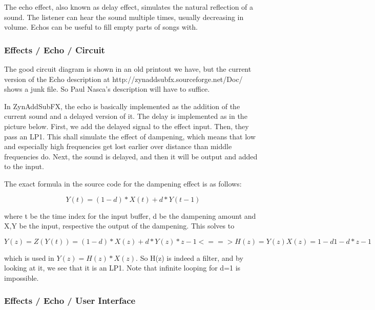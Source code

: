    The echo effect, also known as delay effect, simulates the natural
   reflection of a sound. The listener can hear the sound multiple times,
   usually decreasing in volume. Echos can be useful to fill empty parts of
   songs with.

\subsubsection{Effects / Echo / Circuit}
\label{subsubsec:effects_edit_echo_circuit}

   The good circuit diagram is shown in an old printout we have, but the
   current version of the Echo description at
   http://zynaddsubfx.sourceforge.net/Doc/ shows a
   junk file.  So Paul Nasca's description will have to suffice.


   In ZynAddSubFX, the echo is basically implemented as the addition of the
   current sound and a delayed version of it. The delay is implemented as in
   the picture below. First, we add the delayed signal to the effect input.
   Then, they pass an LP1. This shall simulate the effect of dampening, which
   means that low and especially high frequencies get lost earlier over
   distance than middle frequencies do. Next, the sound is delayed, and then
   it will be output and added to the input.

   The exact formula in the source code for the dampening effect is as
   follows:

   \[Y(t)=(1-d)*X(t)+d*Y(t-1)\]

   where t be the time index for the input buffer, d be the dampening amount
   and X,Y be the input, respective the output of the dampening. This solves
   to

   \[Y(z)=Z(Y(t))=(1-d)*X(z)+d*Y(z)*z-1 <==> H(z)=Y(z)X(z)=1-d1-d*z-1\]

   which is used in \(Y(z)=H(z)*X(z)\). So H(z) is indeed a filter, and by
   looking at it, we see that it is an LP1. Note that infinite looping for
   d=1 is impossible.

\subsubsection{Effects / Echo / User Interface}
\label{subsubsec:effects_edit_echo_ui}

